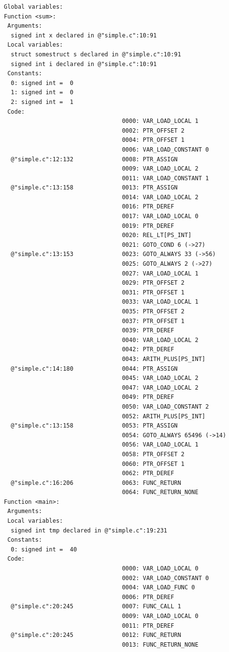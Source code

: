 \documentclass[10pt,a4paper]{report}
\begin{document}
\begin{verbatim}
Global variables:
Function <sum>:
 Arguments:
  signed int x declared in @"simple.c":10:91
 Local variables:
  struct somestruct s declared in @"simple.c":10:91
  signed int i declared in @"simple.c":10:91
 Constants:
  0: signed int =  0
  1: signed int =  0
  2: signed int =  1
 Code:
                                  0000: VAR_LOAD_LOCAL 1
                                  0002: PTR_OFFSET 2
                                  0004: PTR_OFFSET 1
                                  0006: VAR_LOAD_CONSTANT 0
  @"simple.c":12:132              0008: PTR_ASSIGN
                                  0009: VAR_LOAD_LOCAL 2
                                  0011: VAR_LOAD_CONSTANT 1
  @"simple.c":13:158              0013: PTR_ASSIGN
                                  0014: VAR_LOAD_LOCAL 2
                                  0016: PTR_DEREF
                                  0017: VAR_LOAD_LOCAL 0
                                  0019: PTR_DEREF
                                  0020: REL_LT[PS_INT]
                                  0021: GOTO_COND 6 (->27)
  @"simple.c":13:153              0023: GOTO_ALWAYS 33 (->56)
                                  0025: GOTO_ALWAYS 2 (->27)
                                  0027: VAR_LOAD_LOCAL 1
                                  0029: PTR_OFFSET 2
                                  0031: PTR_OFFSET 1
                                  0033: VAR_LOAD_LOCAL 1
                                  0035: PTR_OFFSET 2
                                  0037: PTR_OFFSET 1
                                  0039: PTR_DEREF
                                  0040: VAR_LOAD_LOCAL 2
                                  0042: PTR_DEREF
                                  0043: ARITH_PLUS[PS_INT]
  @"simple.c":14:180              0044: PTR_ASSIGN
                                  0045: VAR_LOAD_LOCAL 2
                                  0047: VAR_LOAD_LOCAL 2
                                  0049: PTR_DEREF
                                  0050: VAR_LOAD_CONSTANT 2
                                  0052: ARITH_PLUS[PS_INT]
  @"simple.c":13:158              0053: PTR_ASSIGN
                                  0054: GOTO_ALWAYS 65496 (->14)
                                  0056: VAR_LOAD_LOCAL 1
                                  0058: PTR_OFFSET 2
                                  0060: PTR_OFFSET 1
                                  0062: PTR_DEREF
  @"simple.c":16:206              0063: FUNC_RETURN
                                  0064: FUNC_RETURN_NONE
Function <main>:
 Arguments:
 Local variables:
  signed int tmp declared in @"simple.c":19:231
 Constants:
  0: signed int =  40
 Code:
                                  0000: VAR_LOAD_LOCAL 0
                                  0002: VAR_LOAD_CONSTANT 0
                                  0004: VAR_LOAD_FUNC 0
                                  0006: PTR_DEREF
  @"simple.c":20:245              0007: FUNC_CALL 1
                                  0009: VAR_LOAD_LOCAL 0
                                  0011: PTR_DEREF
  @"simple.c":20:245              0012: FUNC_RETURN
                                  0013: FUNC_RETURN_NONE
\end{verbatim}
\end{document}
